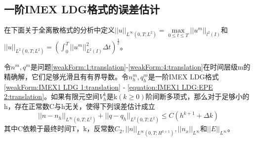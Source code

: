 \subsection{一阶IMEX LDG格式的误差估计}
在下面关于全离散格式的分析中定义$||u||_{L^{\infty}(0,T;L^2)}  = \max \limits_{0 \leq t \leq T}||u^m||_{l^2(I)}$和$||u||_{L^2(0,T;L^2)} = (\int_{0}^{T}||u^m||_{L^2(I)}^2\Delta t)^{\frac{1}{2}}$。
\begin{theorem}
    令$n^m,q^m$是问题\eqref{weakForm:1:translation}-\eqref{weakForm:4:translation}在时间层级m的精确解，它们足够光滑且有有界导数。令$n_h^m,q_h^m$是一阶IMEX LDG格式\eqref{weakForm:IMEX1 LDG 1:translation} - \eqref{equation:IMEX1 LDG:EPE 2:translation}。如果有限元空间$V_h^k$是k$(k\geq  0)$阶间断多项式，那么对于足够小的h，存在正常数C与h无关，使得下列误差估计成立
    \begin{equation}
        ||n-n_h||_{L^{\infty}(0,T;L^2)} + ||q - q_h||_{L^2(0,T;L^2)} \leq C(h^{k+1} + \Delta k)
    \end{equation}
    其中C依赖于最终时间T，k，反常数$C_2, ||n||_{L^{\infty}(0,T;H^{k+1})}, ||n_x||_{L^{\infty}}$和$||E||_{L^{\infty}}$。
\end{theorem}
